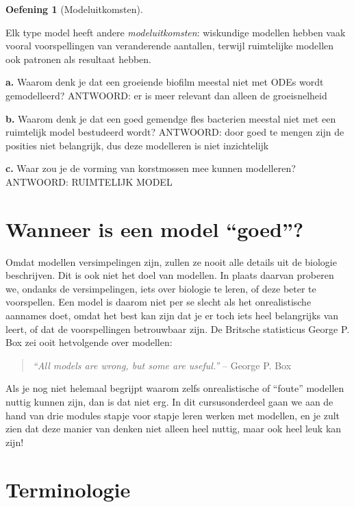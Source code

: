 \documentclass[
  a4paper,
]{scrbook}
\theoremstyle{definition}
\newtheorem{exercise}{Oefening}[chapter]
\theoremstyle{remark}
\begin{document}
\begin{exercise}[Modeluitkomsten]\protect\hypertarget{exr-modeluitkomsten}{}\label{exr-modeluitkomsten}

Elk type model heeft andere \emph{modeluitkomsten}: wiskundige modellen
hebben vaak vooral voorspellingen van veranderende aantallen, terwijl
ruimtelijke modellen ook patronen als resultaat hebben.

\textbf{a.} Waarom denk je dat een groeiende biofilm meestal niet met
ODEs wordt gemodelleerd? ANTWOORD: er is meer relevant dan alleen de
groeisnelheid

\textbf{b.} Waarom denk je dat een goed gemendge fles bacterien meestal
niet met een ruimtelijk model bestudeerd wordt? ANTWOORD: door goed te
mengen zijn de posities niet belangrijk, dus deze modelleren is niet
inzichtelijk

\textbf{c.} Waar zou je de vorming van korstmossen mee kunnen
modelleren? ANTWOORD: RUIMTELIJK MODEL

\end{exercise}

\hypertarget{wanneer-is-een-model-goed}{%
\section{Wanneer is een model
``goed''?}\label{wanneer-is-een-model-goed}}

Omdat modellen versimpelingen zijn, zullen ze nooit alle details uit de
biologie beschrijven. Dit is ook niet het doel van modellen. In plaats
daarvan proberen we, ondanks de versimpelingen, iets over biologie te
leren, of deze beter te voorspellen. Een model is daarom niet per se
slecht als het onrealistische aannames doet, omdat het best kan zijn dat
je er toch iets heel belangrijks van leert, of dat de voorspellingen
betrouwbaar zijn. De Britsche statisticus George P. Box zei ooit
hetvolgende over modellen:

\begin{quote}
\emph{``All models are wrong, but some are useful.''} -- George P. Box
\end{quote}

Als je nog niet helemaal begrijpt waarom zelfs onrealistische of
``foute'' modellen nuttig kunnen zijn, dan is dat niet erg. In dit
cursusonderdeel gaan we aan de hand van drie modules stapje voor stapje
leren werken met modellen, en je zult zien dat deze manier van denken
niet alleen heel nuttig, maar ook heel leuk kan zijn!

\hypertarget{terminologie}{%
\section{Terminologie}\label{terminologie}}
\end{document}
